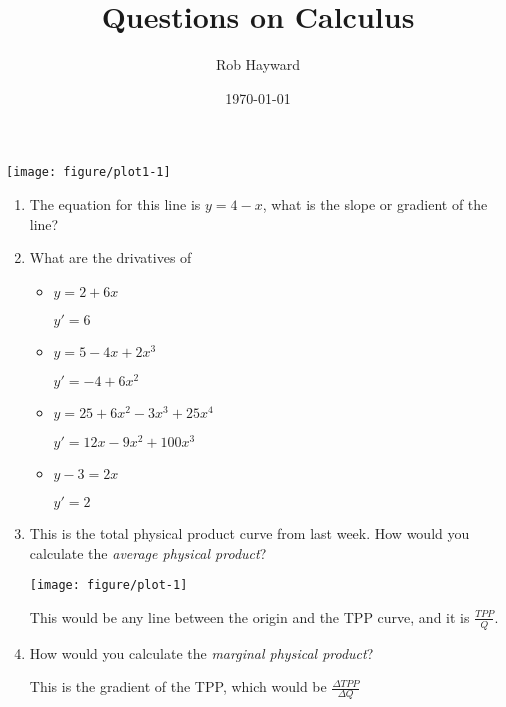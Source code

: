 \documentclass[12pt, a4paper, oneside]{article}\usepackage[]{graphicx}\usepackage[]{color}
\makeatletter
\def\maxwidth{ %
  \ifdim\Gin@nat@width>\linewidth
    \linewidth
  \else
    \Gin@nat@width
  \fi
}
\newenvironment{knitrout}{}{} %
\makeatother
\begin{document}
\title{Questions on Calculus}
\author{Rob Hayward} 
\date{\today}
\maketitle

\doublespacing

\begin{knitrout}
\color{fgcolor}
\texttt{[image: figure/plot1-1]} 

\end{knitrout}
\begin{enumerate}
\item The equation for this line is $y = 4 - x$, what is the slope or gradient of the line? 

\item What are the drivatives of
\begin{itemize}
\item $y = 2 + 6x$

$y' = 6$

\item $y = 5 - 4x +2x^3$

$y' = -4 + 6x^2$

\item $y = 25 +6x^2 - 3x^3 +25x^4$

$y' =  12x -9x^2 +100x^3$

\item $y - 3 = 2x$

$y' = 2$
\end{itemize}


\item This is the total physical product curve from last week.  How would you calculate the \emph{average physical product}? 

\begin{knitrout}
\color{fgcolor}

{\centering \texttt{[image: figure/plot-1]} 

}



\end{knitrout}
This would be any line between the origin and the TPP curve, and it is $\frac{TPP}{Q}$.

\item How would you calculate the \emph{marginal physical product}?

This is the gradient of the TPP, which would be $\frac{\Delta TPP}{\Delta Q}$



\end{enumerate}
\end{document}
